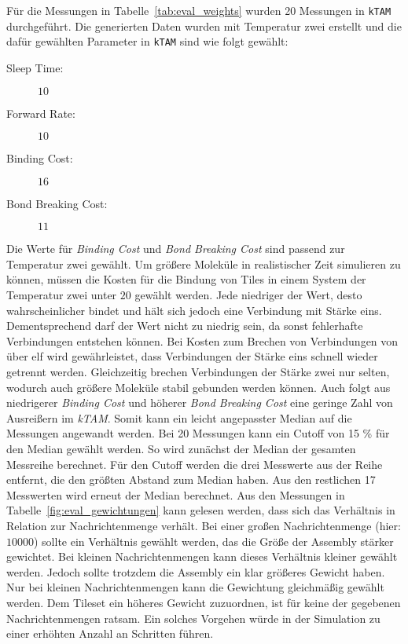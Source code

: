 Für die Messungen in Tabelle~\ref{tab:eval_weights} wurden 20 Messungen in \texttt{kTAM} durchgeführt. Die generierten Daten wurden mit Temperatur zwei erstellt und die dafür gewählten Parameter in \texttt{kTAM} sind wie folgt gewählt:
\begin{description}
    \item[Sleep Time:] $10$
    \item[Forward Rate:] $10$
    \item[Binding Cost:] $16$ 
    \item[Bond Breaking Cost:] $11$
\end{description}
Die Werte für \emph{Binding Cost} und \emph{Bond Breaking Cost} sind passend zur Temperatur zwei gewählt. Um größere Moleküle in realistischer Zeit simulieren zu können, müssen die Kosten für die Bindung von Tiles in einem System der Temperatur zwei unter $20$ gewählt werden. Jede niedriger der Wert, desto wahrscheinlicher bindet und hält sich jedoch eine Verbindung mit Stärke eins. Dementsprechend darf der Wert nicht zu niedrig sein, da sonst fehlerhafte Verbindungen entstehen können. Bei Kosten zum Brechen von Verbindungen von über elf wird gewährleistet, dass Verbindungen der Stärke eins schnell wieder getrennt werden. Gleichzeitig brechen Verbindungen der Stärke zwei nur selten, wodurch auch größere Moleküle stabil gebunden werden können. Auch folgt aus niedrigerer \emph{Binding Cost} und höherer \emph{Bond Breaking Cost} eine geringe Zahl von Ausreißern im \emph{kTAM}. Somit kann ein leicht angepasster Median auf die Messungen angewandt werden. Bei 20 Messungen kann ein Cutoff von 15 \% für den Median gewählt werden. So wird zunächst der Median der gesamten Messreihe berechnet. Für den Cutoff werden die drei Messwerte aus der Reihe entfernt, die den größten Abstand zum Median haben. Aus den restlichen 17 Messwerten wird erneut der Median berechnet. Aus den Messungen in Tabelle~\ref{fig:eval_gewichtungen} kann gelesen werden, dass sich das Verhältnis in Relation zur Nachrichtenmenge verhält. Bei einer großen Nachrichtenmenge (hier: $10000$) sollte ein Verhältnis gewählt werden, das die Größe der Assembly stärker gewichtet. Bei kleinen Nachrichtenmengen kann dieses Verhältnis kleiner gewählt werden. Jedoch sollte trotzdem die Assembly ein klar größeres Gewicht haben. Nur bei kleinen Nachrichtenmengen kann die Gewichtung gleichmäßig gewählt werden. Dem Tileset ein höheres Gewicht zuzuordnen, ist für keine der gegebenen Nachrichtenmengen ratsam. Ein solches Vorgehen würde in der Simulation zu einer erhöhten Anzahl an Schritten führen.

